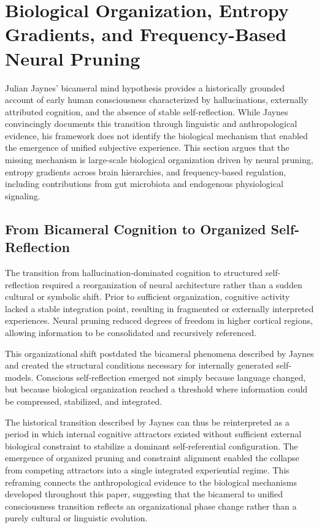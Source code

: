 \documentclass[12pt,letterpaper]{article}
\begin{document}
\section{Biological Organization, Entropy Gradients, and Frequency-Based Neural Pruning}

Julian Jaynes' bicameral mind hypothesis provides a historically grounded account of early human consciousness characterized by hallucinations, externally attributed cognition, and the absence of stable self-reflection. While Jaynes convincingly documents this transition through linguistic and anthropological evidence, his framework does not identify the biological mechanism that enabled the emergence of unified subjective experience. This section argues that the missing mechanism is large-scale biological organization driven by neural pruning, entropy gradients across brain hierarchies, and frequency-based regulation, including contributions from gut microbiota and endogenous physiological signaling.

\subsection{From Bicameral Cognition to Organized Self-Reflection}

The transition from hallucination-dominated cognition to structured self-reflection required a reorganization of neural architecture rather than a sudden cultural or symbolic shift. Prior to sufficient organization, cognitive activity lacked a stable integration point, resulting in fragmented or externally interpreted experiences. Neural pruning reduced degrees of freedom in higher cortical regions, allowing information to be consolidated and recursively referenced.

This organizational shift postdated the bicameral phenomena described by Jaynes and created the structural conditions necessary for internally generated self-models. Conscious self-reflection emerged not simply because language changed, but because biological organization reached a threshold where information could be compressed, stabilized, and integrated.

The historical transition described by Jaynes can thus be reinterpreted as a period in which internal cognitive attractors existed without sufficient external biological constraint to stabilize a dominant self-referential configuration. The emergence of organized pruning and constraint alignment enabled the collapse from competing attractors into a single integrated experiential regime. This reframing connects the anthropological evidence to the biological mechanisms developed throughout this paper, suggesting that the bicameral to unified consciousness transition reflects an organizational phase change rather than a purely cultural or linguistic evolution.
\end{document}
